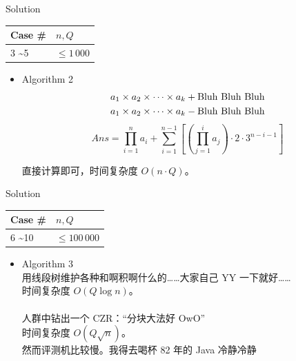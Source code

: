 \documentclass[UTF8]{beamer}
\begin{document}
\begin{frame}{Solution}

\begin{tabularx}{\textwidth}{X|X} \hline
Case \# & $n, Q$ \\ \hline \hline
3 \textasciitilde 5  & $\leq 1\,000$   \\ \hline
\end{tabularx}
\begin{itemize}
    \item Algorithm 2 \\
        \begin{align*}
            &a_1 \times a_2 \times \dots \times a_k + {\rm Bluh\ Bluh\ Bluh} \\
            &a_1 \times a_2 \times \dots \times a_k - {\rm Bluh\ Bluh\ Bluh}
        \end{align*}
        \pause
        $$
            Ans = \prod_{i = 1}^{n} a_i + \sum_{i = 1}^{n - 1} \left [\left (\prod_{j = 1}^i a_j \right ) \cdot 2 \cdot 3^{n - i - 1}\right ]
        $$

        直接计算即可，时间复杂度 $O(n \cdot Q)$。
\end{itemize}

\end{frame}

\begin{frame}{Solution}

\begin{tabularx}{\textwidth}{X|X} \hline
Case \# & $n, Q$ \\ \hline \hline
6 \textasciitilde 10 & $\leq 100\,000$ \\ \hline
\end{tabularx}
\begin{itemize}
    \item Algorithm 3 \\
        用线段树维护各种和啊积啊什么的……大家自己 YY 一下就好…… \\
        时间复杂度 $O(Q \log n)$。\\　\\
        \pause
        人群中钻出一个 CZR：“分块大法好 OwO” \\
        时间复杂度 $O(Q \sqrt n)$。\\
        \pause
        然而评测机比较慢。我得去喝杯 82 年的 Java 冷静冷静
\end{itemize}

\end{frame}
\end{document}
